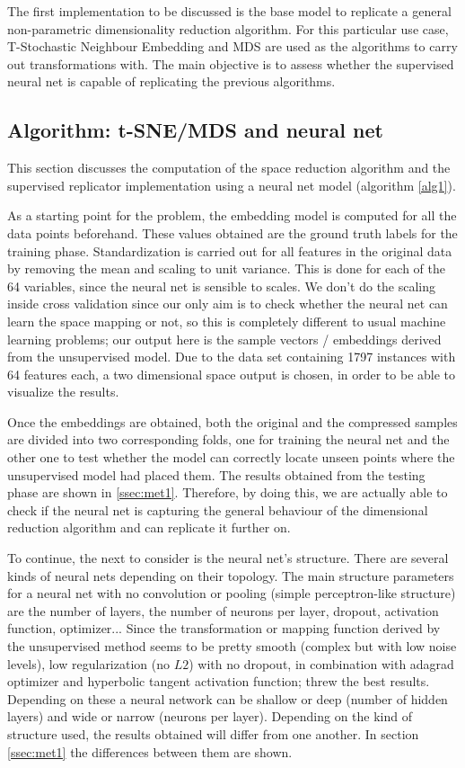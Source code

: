 \documentclass[a4paper,11pt,spanish]{report}
\begin{document}
The first implementation to be discussed is the base model to replicate a general non-parametric dimensionality reduction algorithm. For this particular use case, T-Stochastic Neighbour Embedding and MDS are used as the algorithms to carry out transformations with. The main objective is to assess whether the supervised neural net is capable of replicating the previous algorithms.

\subsection{Algorithm: t-SNE/MDS and neural net}
\label{ssec:dra}

This section discusses the computation of the space reduction algorithm and the supervised replicator implementation using a neural net model (algorithm \ref{alg1}).

As a starting point for the problem, the embedding model is computed for all the data points beforehand. These values obtained are the ground truth labels for the training phase. Standardization is carried out for all features in the original data by removing the mean and scaling to unit variance. This is done for each of the 64 variables, since the neural net is sensible to scales. We don't do the scaling inside cross validation since our only aim is to check whether the neural net can learn the space mapping or not, so this is completely different to usual machine learning problems; our output here is the sample vectors / embeddings derived from the unsupervised model. Due to the data set containing 1797 instances with 64 features each, a two dimensional space output is chosen, in order to be able to visualize the results.

Once the embeddings are obtained, both the original and the compressed samples are divided into two corresponding folds, one for training the neural net and the other one to test whether the model can correctly locate unseen points where the unsupervised model had placed them. The results obtained from the testing phase are shown in \ref{ssec:met1}. Therefore, by doing this, we are actually able to check if the neural net is capturing the general behaviour of the dimensional reduction algorithm and can replicate it further on.

To continue, the next to consider is the neural net's structure.  There are several kinds of neural nets depending on their topology. The main structure parameters for a neural net with no convolution or pooling (simple perceptron-like structure) are the number of layers, the number of neurons per layer, dropout, activation function, optimizer... Since the transformation or mapping function derived by the unsupervised method seems to be pretty smooth (complex but with low noise levels), low regularization (no $L2$) with no dropout, in combination with adagrad optimizer and hyperbolic tangent activation function; threw the best results. Depending on these a neural network can be shallow or deep (number of hidden layers) and wide or narrow (neurons per layer). Depending on the kind of structure used, the results obtained will differ from one another. In section \ref{ssec:met1} the differences between them are shown.
\end{document}
